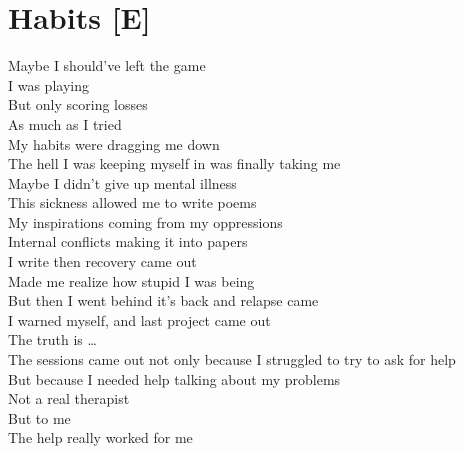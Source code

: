 \documentclass[12pt, b5paper, oneside]{book}
\begin{document}
\section{Habits [E]}
Maybe I should've left the game
\\I was playing
\\But only scoring losses
\\As much as I tried
\\My habits were dragging me down
\\The hell I was keeping myself in was finally taking me
\\Maybe I didn't give up mental illness
\\This sickness allowed me to write poems
\\My inspirations coming from my oppressions
\\Internal conflicts making it into papers
\\I write then recovery came out
\\Made me realize how stupid I was being
\\But then I went behind it's back and relapse came
\\I warned myself, and last project came out
\\The truth is \dots 
\\The sessions came out not only because I struggled to try to ask for help
\\But because I needed help talking about my problems
\\Not a real therapist
\\But to me
\\The help really worked for me 
\newpage
\end{document}
